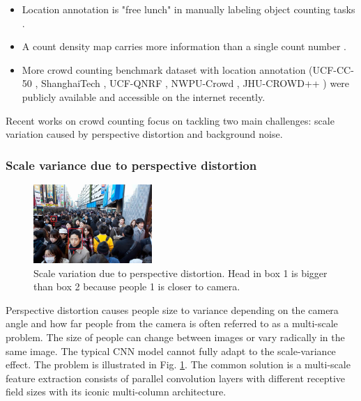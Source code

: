 \begin{itemize}
    \item Location annotation is "free lunch" in manually labeling object counting tasks \cite{lempitsky2010learning}.
    \item A count density map carries more information than a single count number \cite{zhang2016single}.
    \item More crowd counting benchmark dataset with location annotation (UCF-CC-50 \cite{idrees2013multi}, ShanghaiTech \cite{zhang2016single}, UCF-QNRF \cite{idrees2018composition}, NWPU-Crowd \cite{gao2020nwpu}, JHU-CROWD++ \cite{sindagi2020jhucrowd}) 
were publicly available and accessible on the internet recently.
\end{itemize}

Recent works on crowd counting focus on tackling two main challenges: scale variation caused by perspective distortion and background noise.

\subsubsection{Scale variance due to perspective distortion} \hfill

\begin{figure}[htbp]
\centerline{\includegraphics[width=0.4\textwidth]{Picture/problem/part_a_train_IMG_44-annotate-scale.jpg}}
\caption{Scale variation due to perspective distortion. Head in box 1 is bigger than box 2 because people 1 is closer to camera.}
\label{fig:scale}
\end{figure}

Perspective distortion causes people size to variance depending on the camera angle and how far people from the camera is often referred to as a multi-scale problem. The size of people can change between images or vary radically in the same image. The typical CNN model cannot fully adapt to the scale-variance effect. The problem is illustrated in Fig. \ref{fig:scale}. The common solution is a multi-scale feature extraction consists of parallel convolution layers with different receptive field sizes with its iconic multi-column architecture.

